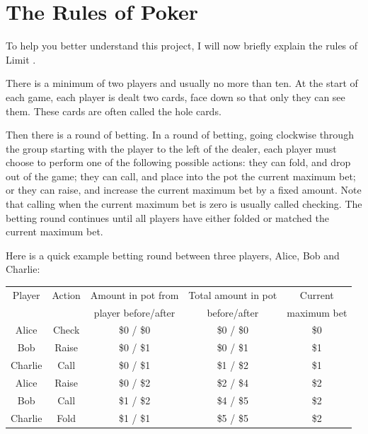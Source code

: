 \section{The Rules of Poker}					%



To help you better understand this project, I will now briefly explain the rules of Limit \texasp. 

There is a minimum of two players and usually no more than ten. At the start of each game, each player is dealt two cards, face down so that only they can see them. These cards are often called the hole cards.

Then there is a round of betting. In a round of betting, going clockwise through the group starting with the player to the left of the dealer, each player must choose to perform one of the following possible actions: they can fold, and drop out of the game; they can call, and place into the pot the current maximum bet; or they can raise, and increase the current maximum bet by a fixed amount. Note that calling when the current maximum bet is zero is usually called checking. The betting round continues until all players have either folded or matched the current maximum bet. 

Here is a quick example betting round between three players, Alice, Bob and Charlie:\\
\begin{center}
\begin{tabular}{c|c|c|c|c}
Player & Action & Amount in pot from & Total amount in pot & Current \\
 & & player before/after & before/after & maximum bet \\
\hline
Alice   & Check & \$0 / \$0 & \$0 / \$0 & \$0 \\
Bob     & Raise & \$0 / \$1 & \$0 / \$1 & \$1 \\
Charlie & Call  & \$0 / \$1 & \$1 / \$2 & \$1 \\
Alice   & Raise & \$0 / \$2 & \$2 / \$4 & \$2 \\
Bob     & Call  & \$1 / \$2 & \$4 / \$5 & \$2 \\
Charlie & Fold  & \$1 / \$1 & \$5 / \$5 & \$2 \\
\end{tabular}
\end{center}

